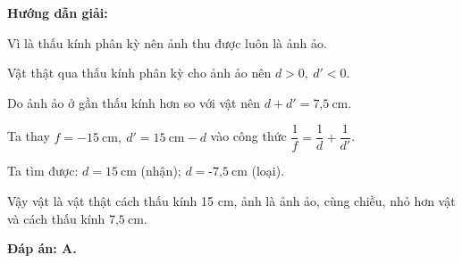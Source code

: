 {
\begin{center}
	\textbf{Hướng dẫn giải:}
\end{center}
	
	Vì là thấu kính phân kỳ nên ảnh thu được luôn là ảnh ảo.
		
	Vật thật qua thấu kính phân kỳ cho ảnh ảo nên $d>0,\ d'<0$.
	
	Do ảnh ảo ở gần thấu kính hơn so với vật nên  $d+d'=\text{7,5}\ \text{cm}$.
	
	Ta thay $f= -15\ \text{cm},\ d'=15\ \text{cm} -d$ vào công thức $\dfrac{1}{f}=\dfrac{1}{d}+\dfrac{1}{d'}$. 
	
	Ta tìm được: $d= 15\ \text{cm}$ (nhận); $d= \text{-7,5}\ \text{cm}$ (loại).
	
	Vậy vật là vật thật cách thấu kính 15 cm, ảnh là ảnh ảo, cùng chiều, nhỏ hơn vật và cách thấu kính $\text{7,5}\ \text{cm}$.
		
		\textbf{Đáp án: A.}
		

		
		
	} 

